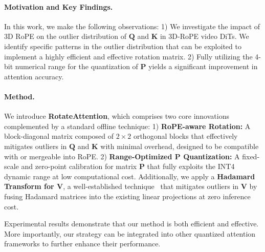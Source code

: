 \paragraph{\textbf{Motivation and Key Findings.} }
In this work, we make the following observations: 
1) We investigate the impact of 3D RoPE on the outlier distribution of $\mathbf{Q}$ and $\mathbf{K}$ in 3D-RoPE video DiTs. We identify specific patterns in the outlier distribution that can be exploited to implement a highly efficient and effective rotation matrix. 
2) Fully utilizing the 4-bit numerical range for the quantization of $\mathbf{P}$ yields a significant improvement in attention accuracy. 

\paragraph{\textbf{Method.} }
We introduce \textbf{RotateAttention}, which comprises two core innovations complemented by a standard offline technique: 
1) \textbf{RoPE-aware Rotation:} A block-diagonal matrix composed of $2 \times 2$ orthogonal blocks that effectively mitigates outliers in $\mathbf{Q}$ and $\mathbf{K}$ with minimal overhead, designed to be compatible with or mergeable into RoPE. 
2) \textbf{Range-Optimized $\mathbf{P}$ Quantization:} A fixed-scale and zero-point calibration for matrix $\mathbf{P}$ that fully exploits the INT4 dynamic range at low computational cost. 
Additionally, we apply a \textbf{Hadamard Transform for $\mathbf{V}$}, a well-established technique~\cite{liu2025spinquant,sun2025flatquant} that mitigates outliers in $\mathbf{V}$ by fusing Hadamard matrices into the existing linear projections at zero inference cost.

Experimental results demonstrate that our method is both efficient and effective. More importantly, our strategy can be integrated into other quantized attention frameworks to further enhance their performance.


